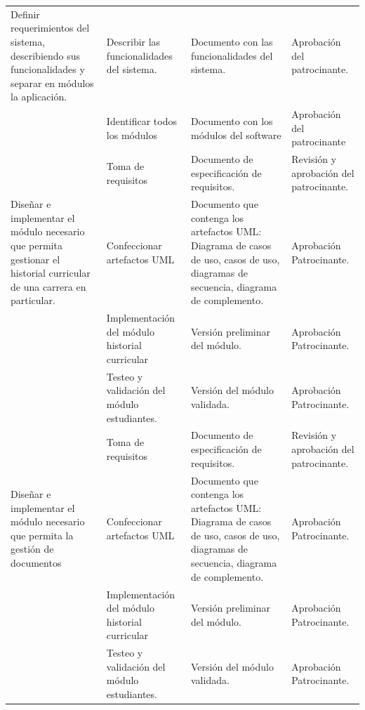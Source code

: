 \documentclass[12pt]{article}
\begin{document}
\begin{center}
\begin{longtable}{|p{4cm}|p{4cm}|p{3cm}|p{4cm}|}
			 Definir requerimientos del sistema, describiendo sus funcionalidades y separar en módulos la aplicación.
			
			& Describir las funcionalidades del sistema. & Documento con las funcionalidades del sistema. & Aprobación del patrocinante. \\ \cline{2-4}
			& Identificar todos los módulos  & Documento con los módulos del software  & Aprobación del patrocinante \\	\hline
		
		
		
		& Toma de requisitos &Documento de especificación de requisitos. & Revisión y aprobación del patrocinante.\\ 		\cline{2-4}
		
		Diseñar e implementar el módulo necesario que permita gestionar el historial curricular de una carrera en particular.
		
		& Confeccionar artefactos UML & Documento que contenga los artefactos UML: Diagrama de casos de uso, casos de uso, diagramas de secuencia, diagrama de complemento. & Aprobación Patrocinante.\\ 		\cline{2-4}
		
		& Implementación del módulo historial curricular & Versión preliminar del módulo. & Aprobación Patrocinante.\\ 	\cline{2-4}
		& Testeo y validación del módulo estudiantes. &Versión del módulo validada. & Aprobación Patrocinante.\\ 	
		\hline
		
		
		
		
		
		& Toma de requisitos &Documento de especificación de requisitos. & Revisión y aprobación del patrocinante.\\ 		\cline{2-4}

	Diseñar e implementar el módulo necesario que permita la gestión de documentos
		
		& Confeccionar artefactos UML & Documento que contenga los artefactos UML: Diagrama de casos de uso, casos de uso, diagramas de secuencia, diagrama de complemento. & Aprobación Patrocinante.\\ 		\cline{2-4}
		
		& Implementación del módulo historial curricular & Versión preliminar del módulo. & Aprobación Patrocinante.\\ 	\cline{2-4}
		& Testeo y validación del módulo estudiantes. &Versión del módulo validada. & Aprobación Patrocinante.\\ 	
		\hline
		

\end{longtable}
\end{center}
\end{document}
